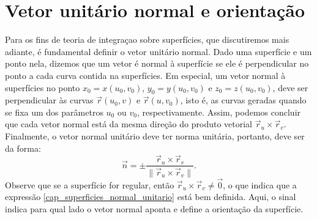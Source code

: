 \section{Vetor unitário normal e orientação}
Para os fins de teoria de integraçao sobre superfícies, que discutiremos mais adiante, é fundamental definir o vetor unitário normal. Dado uma superfície e um ponto nela, dizemos que um vetor é normal à superfície se ele é perpendicular no ponto a cada curva contida na superfícies. Em especial, um vetor normal à superfícies no ponto $x_0=x(u_0,v_0)$, $y_0=y(u_0,v_0)$ e $z_0=z(u_0,v_0)$, deve ser perpendicular às curvas $\vec{r}(u_0,v)$ e $\vec{r}(u,v_0)$, isto é, as curvas geradas quando se fixa um dos parâmetros $u_0$ ou $v_0$, respectivamente. Assim, podemos concluir que cada vetor normal está da mesma direção do produto vetorial $\vec{r}_u\times\vec{r}_v$. Finalmente, o vetor normal unitário deve ter norma unitária, portanto, deve ser da forma:
\begin{equation}\label{cap_superficies_normal_unitario}
 \vec{n} = \pm \frac{\vec{r}_u\times\vec{r}_v}{\|\vec{r}_u\times\vec{r}_v\|}.
\end{equation}
Observe que se a superfície for regular, então $\vec{r}_u\times\vec{r}_v\neq \vec{0}$, o que indica que a expressão \eqref{cap_superficies_normal_unitario} está bem definida. Aqui, o sinal indica para qual lado o vetor normal aponta e define a orientação da superfície. 

